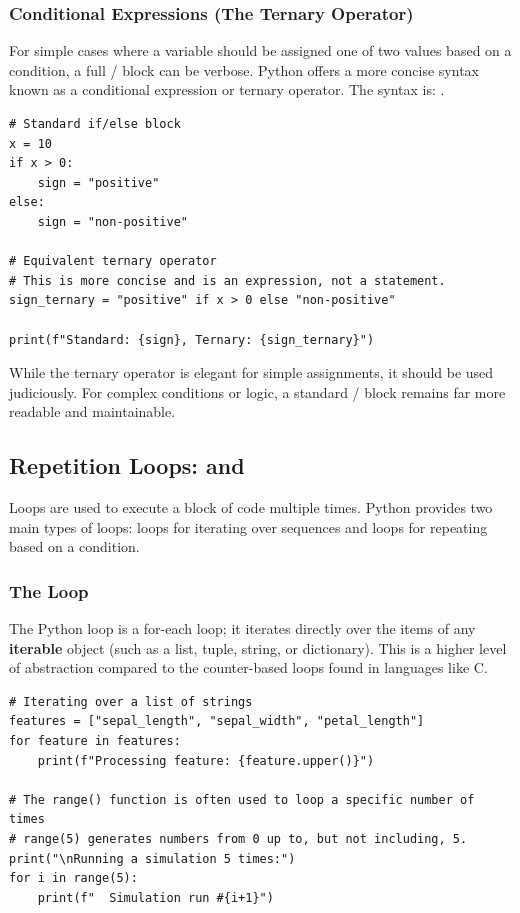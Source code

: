 \subsubsection*{Conditional Expressions (The Ternary Operator)}
For simple cases where a variable should be assigned one of two values based on a condition, a full / block can be verbose. Python offers a more concise syntax known as a conditional expression or ternary operator.
The syntax is: .

\text{ }\begin{verbatim}
# Standard if/else block
x = 10
if x > 0:
    sign = "positive"
else:
    sign = "non-positive"

# Equivalent ternary operator
# This is more concise and is an expression, not a statement.
sign_ternary = "positive" if x > 0 else "non-positive"

print(f"Standard: {sign}, Ternary: {sign_ternary}")
\end{verbatim}
\begin{remark}
While the ternary operator is elegant for simple assignments, it should be used judiciously. For complex conditions or logic, a standard / block remains far more readable and maintainable.
\end{remark}

\subsection{Repetition Loops:  and }
\label{subsec:loops}
Loops are used to execute a block of code multiple times. Python provides two main types of loops:  loops for iterating over sequences and  loops for repeating based on a condition.

\subsubsection*{The  Loop}
The Python  loop is a for-each loop; it iterates directly over the items of any \textbf{iterable} object (such as a list, tuple, string, or dictionary). This is a higher level of abstraction compared to the counter-based loops found in languages like C.

\text{ }\begin{verbatim}
# Iterating over a list of strings
features = ["sepal_length", "sepal_width", "petal_length"]
for feature in features:
    print(f"Processing feature: {feature.upper()}")

# The range() function is often used to loop a specific number of times
# range(5) generates numbers from 0 up to, but not including, 5.
print("\nRunning a simulation 5 times:")
for i in range(5):
    print(f"  Simulation run #{i+1}")
\end{verbatim}

